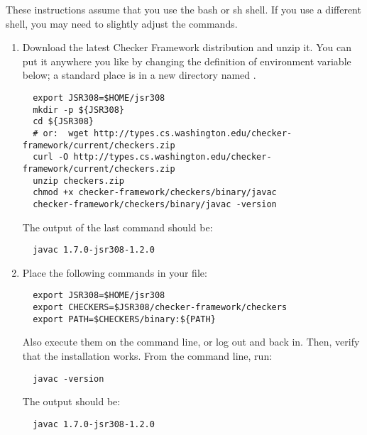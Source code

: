 These instructions assume that you use the bash or sh shell.  If you use a
different shell, you may need to slightly adjust the commands.

\begin{enumerate}

\item
  Download the latest Checker Framework distribution
  and unzip it.  You can put it anywhere you like by changing the
  definition of environment variable  below; a standard place
  is in a
  new directory named .

\begin{Verbatim}
  export JSR308=$HOME/jsr308
  mkdir -p ${JSR308}
  cd ${JSR308}
  # or:  wget http://types.cs.washington.edu/checker-framework/current/checkers.zip
  curl -O http://types.cs.washington.edu/checker-framework/current/checkers.zip
  unzip checkers.zip
  chmod +x checker-framework/checkers/binary/javac
  checker-framework/checkers/binary/javac -version
\end{Verbatim}

The output of the last command should be:

\begin{Verbatim}
  javac 1.7.0-jsr308-1.2.0
\end{Verbatim}


\item
  Place the following commands in your  file:
\begin{Verbatim}
  export JSR308=$HOME/jsr308
  export CHECKERS=$JSR308/checker-framework/checkers
  export PATH=$CHECKERS/binary:${PATH}
\end{Verbatim}


Also execute them on the command line, or log out and back in.  Then,
verify that the installation works.  From the command line, run:

\begin{Verbatim}
  javac -version
\end{Verbatim}

The output should be:

\begin{Verbatim}
  javac 1.7.0-jsr308-1.2.0
\end{Verbatim}

\end{enumerate}

